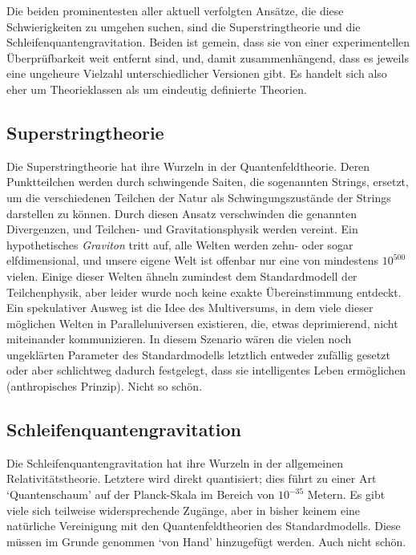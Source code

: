 Die beiden prominentesten aller aktuell verfolgten Ansätze, die diese Schwierigkeiten zu umgehen suchen, sind die Superstringtheorie und die Schleifenquantengravitation. Beiden ist gemein, dass sie von einer experimentellen Überprüfbarkeit weit entfernt sind, und, damit zusammenhängend, dass es jeweils eine ungeheure Vielzahl unterschiedlicher Versionen gibt. Es handelt sich also eher um Theorieklassen als um eindeutig definierte Theorien.


\subsection*{Superstringtheorie}

Die Superstringtheorie hat ihre Wurzeln in der Quantenfeldtheorie. Deren Punktteilchen werden durch schwingende Saiten, die sogenannten Strings, ersetzt, um die verschiedenen Teilchen der Natur als Schwingungszustände der Strings darstellen zu können. Durch diesen Ansatz verschwinden die genannten Divergenzen, und Teilchen- und Gravitationsphysik werden vereint. Ein hypothetisches \emph{Graviton} tritt auf, alle Welten werden zehn- oder sogar elfdimensional, und unsere eigene Welt ist offenbar nur eine von mindestens $10^{500}$ vielen. Einige dieser Welten ähneln zumindest dem Standardmodell der Teilchenphysik, aber leider wurde noch keine exakte Übereinstimmung entdeckt. Ein spekulativer Ausweg ist die Idee des Multiversums, in dem viele dieser möglichen Welten in Paralleluniversen existieren, die, etwas deprimierend, nicht miteinander kommunizieren. In diesem Szenario wären die vielen noch ungeklärten Parameter des Standardmodells letztlich entweder zufällig gesetzt oder aber schlichtweg dadurch festgelegt, dass sie intelligentes Leben ermöglichen (anthropisches Prinzip). Nicht so schön.


\subsection*{Schleifenquantengravitation}

Die Schleifenquantengravitation hat ihre Wurzeln in der allgemeinen Relativitätstheorie. Letztere wird direkt quantisiert; dies führt zu einer Art \enquote*{Quantenschaum} auf der Planck-Skala im Bereich von $10^{-35}$ Metern. Es gibt viele sich teilweise widersprechende Zugänge, aber in bisher keinem eine natürliche Vereinigung mit den Quantenfeldtheorien des Standardmodells. Diese müssen im Grunde genommen \enquote*{von Hand} hinzugefügt werden. Auch nicht schön.



